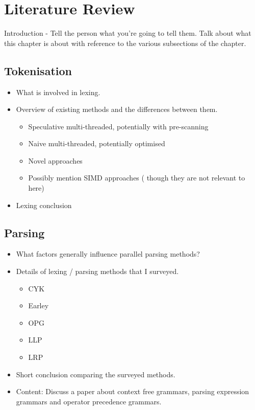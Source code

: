 

\section{Literature Review}
\begin{sectionplan}
Introduction - Tell the person what you're going to tell them. Talk about what this chapter is about with reference to the various subsections of the chapter.
\end{sectionplan}

\subsection{Tokenisation}
\begin{sectionplan}
    \begin{itemize}
        \item What is involved in lexing.
        \item Overview of existing methods and the differences between them.
        \begin{itemize}
            \item Speculative multi-threaded, potentially with pre-scanning
            \item Naive multi-threaded, potentially optimised
            \item Novel approaches
            \item Possibly mention SIMD approaches ( though they are not relevant to here)
        \end{itemize}
        \item Lexing conclusion 
    \end{itemize}
\end{sectionplan}

\subsection{Parsing}
\begin{sectionplan}
    \begin{itemize}
        \item What factors generally influence parallel parsing methods?
        \item Details of lexing / parsing methods that I surveyed.
        \begin{itemize}
            \item CYK
            \item Earley
            \item OPG 
            \item LLP
            \item LRP
        \end{itemize}
        \item Short conclusion comparing the surveyed methods.
        \item Content: Discuss a paper about context free grammars, parsing expression grammars and operator precedence grammars. 
    \end{itemize}
\end{sectionplan}

